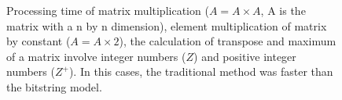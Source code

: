 \documentclass[10pt]{article}
\begin{document}
\begin{figure}[h]
{  }
  \caption{Processing time of matrix multiplication ($A = A \times A$, A is the 
matrix with a n by n dimension), 
  element multiplication of matrix by constant ($A=A \times 2$), the calculation 
of transpose and maximum of a 
  matrix involve integer numbers ($Z$) and positive integer numbers ($Z^+$). In 
this cases, the traditional 
  method was faster than the bitstring model.}
  \label{fig:27282930}
\end{figure}
\end{document}
